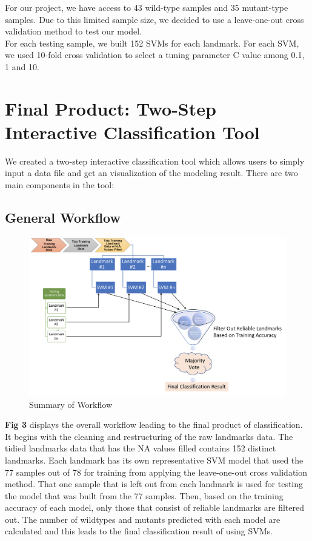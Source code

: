 \documentclass[10pt,letterpaper]{article}
\begin{document}
For our project, we have access to 43 wild-type samples and 35
mutant-type samples. Due to this limited sample size, we decided to use
a leave-one-out cross validation method to test our model.\\
For each testing sample, we built 152 SVMs for each landmark. For each
SVM, we used 10-fold cross validation to select a tuning parameter C
value among 0.1, 1 and 10.

\section{Final Product: Two-Step Interactive Classification
Tool}\label{final-product-two-step-interactive-classification-tool}

We created a two-step interactive classification tool which allows users
to simply input a data file and get an visualization of the modeling
result. There are two main components in the tool:

\subsection{General Workflow}\label{general-workflow}

\begin{figure}[h]

{\centering \includegraphics{figures/Figure1} 

}

\caption{Summary of Workflow}\label{fig:workflow}
\end{figure}

\textbf{Fig 3} displays the overall workflow leading to the final
product of classification. It begins with the cleaning and restructuring
of the raw landmarks data. The tidied landmarks data that has the NA
values filled contains 152 distinct landmarks. Each landmark has its own
representative SVM model that used the 77 samples out of 78 for training
from applying the leave-one-out cross validation method. That one sample
that is left out from each landmark is used for testing the model that
was built from the 77 samples. Then, based on the training accuracy of
each model, only those that consist of reliable landmarks are filtered
out. The number of wildtypes and mutants predicted with each model are
calculated and this leads to the final classification result of using
SVMs.
\end{document}
